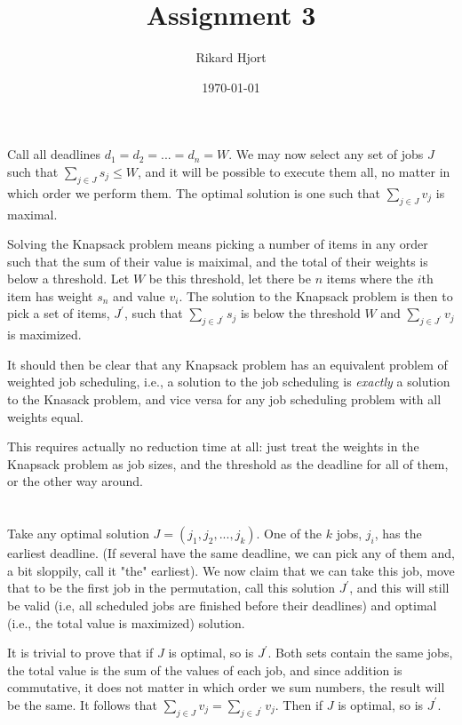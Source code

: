 \documentclass{article}
\title{Assignment 3}
\date{\today}
\author{Rikard Hjort}
\begin{document}
\maketitle

\section{}

Call all deadlines $d_1 = d_2 = ... = d_n = W$. We may now select any set of jobs $J$ such that $\sum_{j \in J} s_j \leq W$, and it will be possible to execute them all, no matter in which order we perform them. The optimal solution is one such that $\sum_{j \in J} v_j$ is maximal.

Solving the Knapsack problem means picking a number of items in any order such that the sum of their value is maiximal, and the total of their weights is below a threshold. Let $W$ be this threshold, let there be $n$ items where the $i$th item has weight $s_n$ and value $v_i$. The solution to the Knapsack problem is then to pick a set of items, $J^\prime$, such that $\sum_{j \in J^\prime} s_j$ is below the threshold $W$ and $\sum_{j \in J^\prime} v_j$ is maximized.

It should then be clear that any Knapsack problem has an equivalent problem of weighted job scheduling, i.e., a solution to the job scheduling is \textit{exactly} a solution to the Knasack problem, and vice versa for any job scheduling problem with all weights equal.

This requires actually no reduction time at all: just treat the weights in the Knapsack problem as job sizes, and the threshold as the deadline for all of them, or the other way around.

\section{}

Take any optimal solution $J = (j_1, j_2, ..., j_k)$. One of the $k$ jobs, $j_i$, has the earliest deadline. (If several have the same deadline, we can pick any of them and, a bit sloppily, call it "the" earliest). We now claim that we can take this job, move that to be the first job in the permutation, call this solution $J^\prime$, and this will still be valid (i.e, all scheduled jobs are finished before their deadlines) and optimal (i.e., the total value is maximized) solution.

It is trivial to prove that if $J$ is optimal, so is $J^\prime$. Both sets contain the same jobs, the total value is the sum of the values of each job, and since addition is commutative, it does not matter in which order we sum numbers, the result will be the same. It follows that $\sum_{j \in J} v_j = \sum_{j \in J^\prime} v_j$. Then if $J$ is optimal, so is $J^\prime$.
\end{document}
